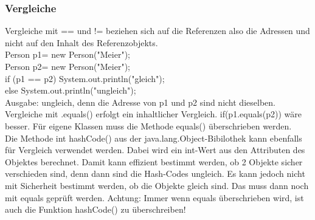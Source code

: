 \subsubsection{Vergleiche}
Vergleiche mit == und != beziehen sich auf die Referenzen also die Adressen und nicht auf den Inhalt des Referenzobjekts. \\ 
Person p1= new Person("Meier"); \\
Person p2= new Person("Meier"); \\
if (p1 == p2) System.out.println("gleich"); \\
else  System.out.println("ungleich"); \\
Ausgabe: ungleich, denn die Adresse von p1 und p2 sind nicht dieselben. \\
Vergleiche mit .equals() erfolgt ein inhaltlicher Vergleich.
if(p1.equals(p2)) wäre besser. Für eigene Klassen muss die Methode equals() überschrieben werden. \\
Die Methode int hashCode() aus der java.lang.Object-Bibilothek kann ebenfalls für Vergleich verwendet werden. Dabei wird ein int-Wert aus den Attributen des Objektes berechnet. Damit kann effizient bestimmt werden, ob 2 Objekte sicher verschieden sind, denn dann sind die Hash-Codes ungleich. Es kann jedoch nicht mit Sicherheit bestimmt werden, ob die Objekte gleich sind. Das muss dann noch mit equals geprüft werden. Achtung: Immer wenn equals überschrieben wird, ist auch die Funktion hashCode() zu überschreiben!\\
